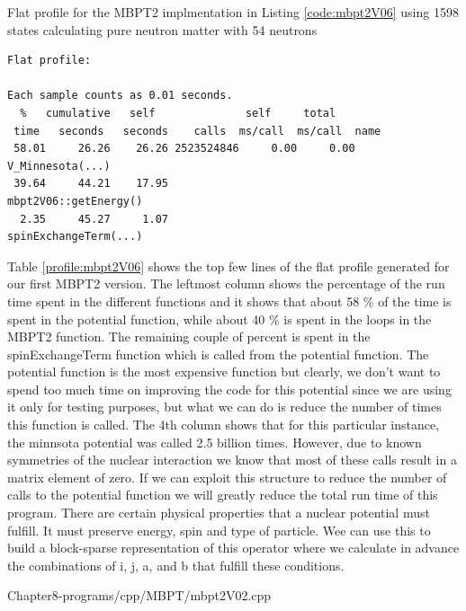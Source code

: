 \begin{table}
\caption{Flat profile for the MBPT2 implmentation in Listing \ref{code:mbpt2V06}
using 1598 states calculating pure neutron matter with 54 neutrons}\label{profile:mbpt2V06}
\begin{verbatim}
Flat profile:

Each sample counts as 0.01 seconds.
  %   cumulative   self              self     total           
 time   seconds   seconds    calls  ms/call  ms/call  name    
 58.01     26.26    26.26 2523524846     0.00     0.00  V_Minnesota(...)
 39.64     44.21    17.95                             mbpt2V06::getEnergy()
  2.35     45.27     1.07                             spinExchangeTerm(...)
\end{verbatim}
\end{table}
Table \ref{profile:mbpt2V06} shows the
top few lines of the flat profile generated for our first MBPT2 version. The
leftmost column shows the percentage of the run time spent in the different
functions and it shows that about 58 \% of the time is spent in the potential
function, while about 40 \% is spent in the loops in the MBPT2 function. The
remaining couple of percent is spent in the spinExchangeTerm function which is
called from the potential function.
The potential function is the most expensive function but clearly, we don't want
to spend too much time on improving the code for this
potential since we are using it only for testing purposes, but what we can do is
reduce the number of times this function is called. The 4th column shows that
for this particular instance, the minnsota potential was called 2.5 billion
    times. However, due to known symmetries of the nuclear interaction
    we know that most of these calls result in a matrix element of zero. If we
    can exploit this structure to reduce the number of calls to the potential
    function we will greatly reduce the total run time of this program.
    There are certain physical properties that a nuclear potential must fulfill.
    It must preserve energy, spin and type of particle. Wee can use this to
    build a block-sparse representation of this operator where we calculate in
    advance the combinations of i, j, a, and b that fulfill these conditions.


{Chapter8-programs/cpp/MBPT/mbpt2V02.cpp}

